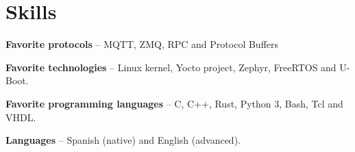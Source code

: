 \section{Skills}
\begin{small}
	\parbox[t][][t]{\linewidth}{
		\textbf{Favorite protocols} -- {MQTT, ZMQ, RPC and Protocol Buffers}
		\bigbreak
	}
	\parbox[t][][t]{\linewidth}{
		\textbf{Favorite technologies} -- {Linux kernel, Yocto project, Zephyr, FreeRTOS and U-Boot.}
		\bigbreak
	}
	\parbox[t][][t]{\linewidth}{
		\textbf{Favorite programming languages} -- {C, C++, Rust, Python 3, Bash, Tcl and VHDL.}
		\bigbreak
	}
	\parbox[t][][t]{\linewidth}{
		\textbf{Languages} -- {Spanish (native) and English (advanced).}
		\bigbreak
	}
\end{small}
